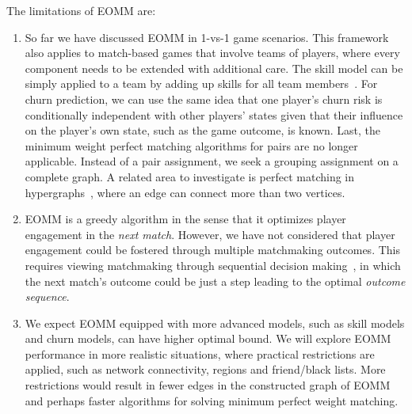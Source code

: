 The limitations of EOMM are:
\begin{enumerate}
\item So far we have discussed EOMM in 1-vs-1 game scenarios. This framework also applies to match-based games that involve teams of players, where every component needs to be extended with additional care. The skill model can be simply applied to a team by adding up skills for all team members~\citep{herbrich:trueskill}. For churn prediction, we can use the same idea that one player's churn risk is conditionally independent with other players' states given that their influence on the player's own state, such as the game outcome, is known. Last, the minimum weight perfect matching algorithms for pairs are no longer applicable. Instead of a pair assignment, we seek a grouping assignment on a complete graph. A related area to investigate is perfect matching in hypergraphs~\citep{berge1984hypergraphs}, where an edge can connect more than two vertices. 

\item EOMM is a greedy algorithm in the sense that it optimizes player engagement in the \textit{next match}. However, we have not considered that player engagement could be fostered through multiple matchmaking outcomes. This requires viewing matchmaking through sequential decision making~\citep{littman1996algorithms}, in which the next match's outcome could be just a step leading to the optimal \textit{outcome sequence}. 


\item We expect EOMM equipped with more advanced models, such as skill models and churn models, can have higher optimal bound. We will explore EOMM performance in more realistic situations, where practical restrictions are applied, such as network connectivity, regions and friend/black lists. More restrictions would result in fewer edges in the constructed graph of EOMM and perhaps faster algorithms for solving minimum perfect weight matching. 
\end{enumerate}



